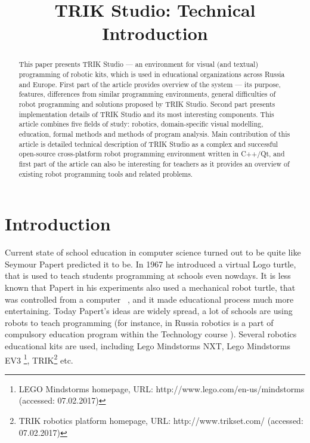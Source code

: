 \documentclass[conference]{IEEEtran}
\begin{document}
\title{TRIK Studio: Technical Introduction}
\date{}%

\author{
\and
}

\maketitle

\begin{abstract}
This paper presents TRIK Studio --- an environment for visual (and textual) programming of robotic kits, which is used in educational organizations across Russia and Europe. First part of the article provides overview of the system --- its purpose, features, differences from similar programming environments, general difficulties of robot programming and solutions proposed by TRIK Studio. Second part presents implementation details of TRIK Studio and its most interesting components. This article combines five fields of study: robotics, domain-specific visual modelling, education, formal methods and methods of program analysis. Main contribution of this article is detailed technical description of TRIK Studio as a complex and successful open-source cross-platform robot programming environment written in C++/Qt, and first part of the article can also be interesting for teachers as it provides an overview of existing robot programming tools and related problems.
\end{abstract}

\section{Introduction}
\label{chapter:intro}
Current state of school education in computer science turned out to be quite like Seymour Papert predicted it to be. In 1967 he introduced a virtual Logo turtle, that is used to teach students programming at schools even nowdays. It is less known that Papert in his experiments also used a mechanical robot turtle, that was controlled from a computer ~\cite{papert1980mindstorms}, and it made educational process much more entertaining. Today Papert's ideas are widely spread, a lot of schools are using robots to teach programming (for instance, in Russia robotics is a part of compulsory education program within the Technology course \cite{черёмухин2014внедрение,лучин2016внедрение}). Several robotics educational kits are used, including Lego Mindstorms NXT, Lego Mindstorms EV3 \footnote{LEGO Mindstorms homepage, URL: http://www.lego.com/en-us/mindstorms (accessed: 07.02.2017)}, 
TRIK\footnote{TRIK robotics platform homepage, URL: http://www.trikset.com/ (accessed: 07.02.2017)} etc.
\end{document}
